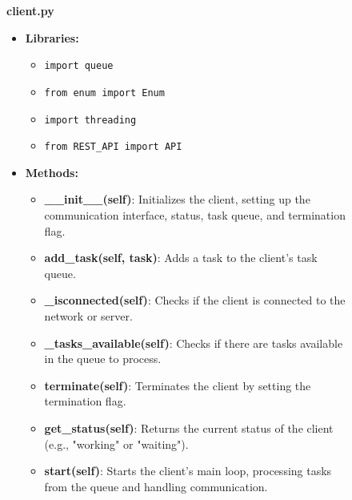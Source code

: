 \documentclass{article}
\begin{document}
\begin{figure}[h!]
\begin{itemize}
{    \item \textbf{client.py}
    \begin{itemize}
        \item \textbf{Libraries:}
        \begin{itemize}
            \item \texttt{import queue}
            \item \texttt{from enum import Enum}
            \item \texttt{import threading}
            \item \texttt{from REST\_API import API}
        \end{itemize}
        \item \textbf{Methods:}
        \begin{itemize}
            \item \textbf{\_\_init\_\_(self)}: Initializes the client, setting up the communication interface, status, task queue, and termination flag.
            \item \textbf{add\_task(self, task)}: Adds a task to the client's task queue.
            \item \textbf{\_isconnected(self)}: Checks if the client is connected to the network or server.
            \item \textbf{\_tasks\_available(self)}: Checks if there are tasks available in the queue to process.
            \item \textbf{terminate(self)}: Terminates the client by setting the termination flag.
            \item \textbf{get\_status(self)}: Returns the current status of the client (e.g., "working" or "waiting").
            \item \textbf{start(self)}: Starts the client's main loop, processing tasks from the queue and handling communication.
        \end{itemize}
    \end{itemize}

}
\end{itemize}
\end{figure}
\end{document}
